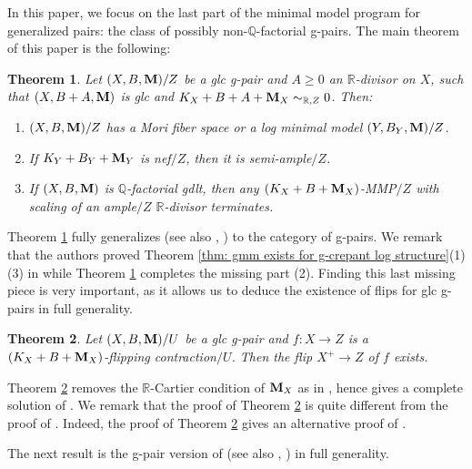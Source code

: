 \documentclass[11pt]{amsart}
\numberwithin{equation}{section}
\newcommand{\Mm}{{\bf{M}}}
\newcommand{\Qq}{\mathbb{Q}}
\newcommand{\Rr}{\mathbb{R}}
\newtheorem{thm}{Theorem}[section]
\theoremstyle{definition}
\theoremstyle{definition}
\theoremstyle{definition}
\begin{document}
In this paper, we focus on the last part of the minimal model program
for generalized pairs: the class of possibly non-$\mathbb
Q$-factorial g-pairs. The main theorem of this paper is the following:
\begin{thm}\label{thm: gmm exists for g-crepant log structure}
  Let $(X,B,\Mm)/Z$ be a glc g-pair and $A\geq 0$ an $\Rr$-divisor on
  $X$, such that $(X,B+A,\Mm)$ is glc and $K_X+B+A+\Mm_X\sim_{\Rr,Z}0$. Then:
  \begin{enumerate}
    \item $(X,B,\Mm)/Z$ has a Mori fiber space or a log minimal model
      $(Y,B_Y,\Mm)/Z$.
    \item If $K_Y+B_Y+\Mm_Y$ is nef$/Z$, then it is semi-ample$/Z$.
    \item If $(X,B,\Mm)$ is $\Qq$-factorial gdlt, then any
      $(K_X+B+\Mm_X)$-MMP$/Z$ with scaling of an ample$/Z$
      $\Rr$-divisor terminates.
  \end{enumerate}
\end{thm}
Theorem \ref{thm: gmm exists for g-crepant log structure} fully
generalizes \cite[Theorem 1.1]{Bir12}(see also \cite[Theorem
1.6]{HX13}, \cite[Theorem 1.1]{Has19}) to the category of g-pairs. We
remark that the authors proved Theorem \ref{thm: gmm exists for
g-crepant log structure}(1)(3) in \cite[Theorem 1.3]{LX22} while
Theorem \ref{thm: gmm exists for g-crepant log structure} completes
the missing part (2). Finding this last missing piece is very
important, as it allows us to deduce the existence of flips for glc
g-pairs in full generality.

\begin{thm}\label{thm: glc flip exists}
  Let $(X,B,\Mm)/U$ be a glc g-pair and $f:X \to Z$ is a
  $(K_X+B+\Mm_X)$-flipping contraction$/U$. Then the flip $X^+\to Z$
  of $f$ exists.
\end{thm}

Theorem \ref{thm: glc flip exists} removes the $\mathbb R$-Cartier
condition of $\Mm_X$ as in \cite[Theorem 1.2]{HL21a}, hence gives a
complete solution of \cite[Conjecture 3.12]{HL22}. We remark that the
proof of Theorem \ref{thm: glc flip exists} is quite different from
the proof of \cite[Theorem 1.2]{HL21a}. Indeed, the proof of Theorem
\ref{thm: glc flip exists} gives an alternative proof of
\cite[Theorem 1.2]{HL21a}.

\smallskip

The next result is the g-pair version of  \cite[Theorem
1.1]{HX13}(see also \cite[Theorem 1.4]{Bir12}, \cite[Theorem
1.1]{Has19}) in full generality.
\end{document}
